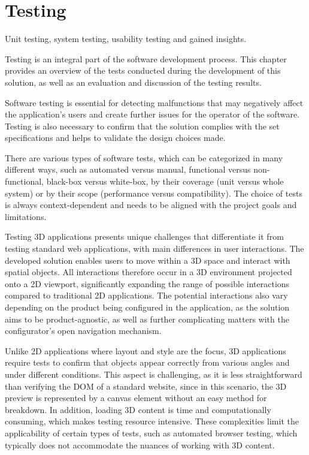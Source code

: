 \chapter{Testing}

\begin{chapterabstract}
    Unit testing, system testing, usability testing and gained insights.
\end{chapterabstract}

Testing is an integral part of the software development process. This chapter provides an overview of the tests conducted during the development of this solution, as well as an evaluation and discussion of the testing results.

Software testing is essential for detecting malfunctions that may negatively affect the application's users and create further issues for the operator of the software. Testing is also necessary to confirm that the solution complies with the set specifications and helps to validate the design choices made. \cite{Homes2012}

There are various types of software tests, which can be categorized in many different ways, such as automated versus manual, functional versus non-functional, black-box versus white-box, by their coverage (unit versus whole system) or by their scope (performance versus compatibility). The choice of tests is always context-dependent and needs to be aligned with the project goals and limitations. \cite{Krysik2023}

Testing 3D applications presents unique challenges that differentiate it from testing standard web applications, with main differences in user interactions. The developed solution enables users to move within a 3D space and interact with spatial objects. All interactions therefore occur in a 3D environment projected onto a 2D viewport, significantly expanding the range of possible interactions compared to traditional 2D applications. The potential interactions also vary depending on the product being configured in the application, as the solution aims to be product-agnostic, as well as further complicating matters with the configurator's open navigation mechanism.

Unlike 2D applications where layout and style are the focus, 3D applications require tests to confirm that objects appear correctly from various angles and under different conditions. This aspect is challenging, as it is less straightforward than verifying the DOM of a standard website, since in this scenario, the 3D preview is represented by a canvas element without an easy method for breakdown. In addition, loading 3D content is time and computationally consuming, which makes testing resource intensive. These complexities limit the applicability of certain types of tests, such as automated browser testing, which typically does not accommodate the nuances of working with 3D content.

